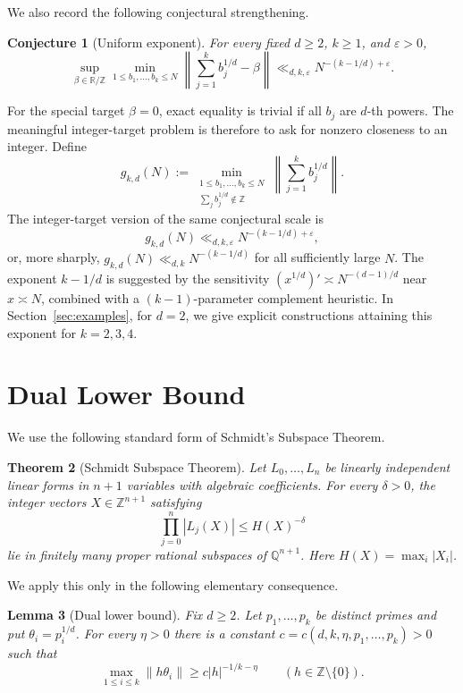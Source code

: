 \documentclass[11pt]{article}
\newtheorem{theorem}{Theorem}[section]
\newtheorem{lemma}[theorem]{Lemma}
\newtheorem{conjecture}[theorem]{Conjecture}
\theoremstyle{remark}
\newcommand{\Z}{\mathbb Z}
\newcommand{\Q}{\mathbb Q}
\newcommand{\T}{\mathbb R/\mathbb Z}
\newcommand{\eps}{\varepsilon}
\begin{document}
\bigskip
\noindent
We also record the following conjectural strengthening.

\begin{conjecture}[Uniform exponent]\label{conj:uniform}
For every fixed $d\geq 2$, $k\geq 1$, and $\eps>0$,
\[
  \sup_{\beta\in\T}
  \min_{1\leq b_1,\ldots,b_k\leq N}
  \left\|\sum_{j=1}^k b_j^{1/d}-\beta\right\|
  \ll_{d,k,\eps} N^{-(k-1/d)+\eps}.
\]
\end{conjecture}

\smallskip
\noindent
For the special target $\beta=0$, exact equality is trivial if all $b_j$ are $d$-th powers. The meaningful integer-target problem is therefore to ask for nonzero closeness to an integer. Define
\[
  g_{k,d}(N):=
  \min_{\substack{1\leq b_1,\ldots,b_k\leq N\\
  \sum_j b_j^{1/d}\notin\Z}}
  \left\|\sum_{j=1}^k b_j^{1/d}\right\|.
\]
The integer-target version of the same conjectural scale is
\[
  g_{k,d}(N)\ll_{d,k,\eps}N^{-(k-1/d)+\eps},
\]
or, more sharply, $g_{k,d}(N)\ll_{d,k} N^{-(k-1/d)}$ for all sufficiently large $N$. The exponent $k-1/d$ is suggested by the sensitivity $(x^{1/d})'\asymp N^{-(d-1)/d}$ near $x\asymp N$, combined with a $(k-1)$-parameter complement heuristic. In Section~\ref{sec:examples}, for $d=2$, we give explicit constructions attaining this exponent for $k=2,3,4$.

\section{Dual Lower Bound}\label{sec:subspace}

We use the following standard form of Schmidt's Subspace Theorem.

\begin{theorem}[Schmidt Subspace Theorem]\label{thm:sst}
Let $L_0,\ldots,L_n$ be linearly independent linear forms in $n+1$ variables with algebraic coefficients. For every $\delta>0$, the integer vectors $X\in\Z^{n+1}$ satisfying
\[
  \prod_{j=0}^n |L_j(X)|\leq H(X)^{-\delta}
\]
lie in finitely many proper rational subspaces of $\Q^{n+1}$. Here $H(X)=\max_i |X_i|$.
\end{theorem}

\smallskip
\noindent
We apply this only in the following elementary consequence.

\begin{lemma}[Dual lower bound]\label{lem:dual-lower}
Fix $d\geq 2$. Let $p_1,\ldots,p_k$ be distinct primes and put $\theta_i=p_i^{1/d}$. For every $\eta>0$ there is a constant $c=c(d,k,\eta,p_1,\ldots,p_k)>0$ such that
\[
  \max_{1\leq i\leq k}\|h\theta_i\|\geq c |h|^{-1/k-\eta}
  \qquad(h\in\Z\setminus\{0\}).
\]
\end{lemma}
\end{document}
